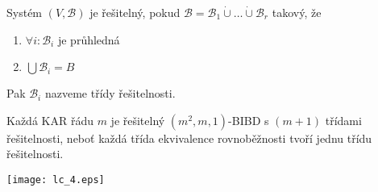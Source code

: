 \begin{definition}
	Systém $(V,\mathcal{B})$ je řešitelný, pokud $\mathcal{B}=\mathcal{B}_1\dot\cup\dots\dot\cup\mathcal{B}_r$ takový, že
    \begin{enumerate}
        \item $\forall i: \mathcal{B}_i$ je průhledná
        \item $\bigcup\mathcal{B}_i=B$
    \end{enumerate}

    Pak $\mathcal{B}_i$ nazveme třídy řešitelnosti.
\end{definition}

\begin{example}
	Každá KAR řádu $m$ je řešitelný $(m^2, m, 1)$-BIBD s $(m + 1)$ třídami řešitelnosti, neboť každá třída ekvivalence rovnoběžnosti tvoří jednu třídu řešitelnosti.

	\texttt{[image: lc\_4.eps]}
\end{example}

